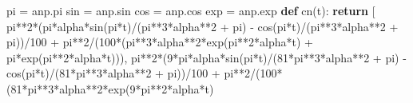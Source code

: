 \documentclass[
  11pt,
]{article}
\newenvironment{Shaded}{}{}
\newcommand{\ControlFlowTok}[1]{\textcolor[rgb]{0.00,0.44,0.13}{\textbf{#1}}}
\newcommand{\DecValTok}[1]{\textcolor[rgb]{0.25,0.63,0.44}{#1}}
\newcommand{\KeywordTok}[1]{\textcolor[rgb]{0.00,0.44,0.13}{\textbf{#1}}}
\newcommand{\NormalTok}[1]{#1}
\newcommand{\OperatorTok}[1]{\textcolor[rgb]{0.40,0.40,0.40}{#1}}
\begin{document}
\begin{Shaded}
\begin{Highlighting}[]
\NormalTok{pi }\OperatorTok{=}\NormalTok{ anp.pi}
\NormalTok{sin }\OperatorTok{=}\NormalTok{ anp.sin}
\NormalTok{cos }\OperatorTok{=}\NormalTok{ anp.cos}
\NormalTok{exp }\OperatorTok{=}\NormalTok{ anp.exp}
\KeywordTok{def}\NormalTok{ cn(t):}
    \ControlFlowTok{return}\NormalTok{ [}
\NormalTok{        pi}\OperatorTok{**}\DecValTok{2}\OperatorTok{*}\NormalTok{(pi}\OperatorTok{*}\NormalTok{alpha}\OperatorTok{*}\NormalTok{sin(pi}\OperatorTok{*}\NormalTok{t)}\OperatorTok{/}\NormalTok{(pi}\OperatorTok{**}\DecValTok{3}\OperatorTok{*}\NormalTok{alpha}\OperatorTok{**}\DecValTok{2} \OperatorTok{+}\NormalTok{ pi) }
            \OperatorTok{{-}}\NormalTok{ cos(pi}\OperatorTok{*}\NormalTok{t)}\OperatorTok{/}\NormalTok{(pi}\OperatorTok{**}\DecValTok{3}\OperatorTok{*}\NormalTok{alpha}\OperatorTok{**}\DecValTok{2} \OperatorTok{+}\NormalTok{ pi))}\OperatorTok{/}\DecValTok{100} 
            \OperatorTok{+}\NormalTok{ pi}\OperatorTok{**}\DecValTok{2}\OperatorTok{/}\NormalTok{(}\DecValTok{100}\OperatorTok{*}\NormalTok{(pi}\OperatorTok{**}\DecValTok{3}\OperatorTok{*}\NormalTok{alpha}\OperatorTok{**}\DecValTok{2}\OperatorTok{*}\NormalTok{exp(pi}\OperatorTok{**}\DecValTok{2}\OperatorTok{*}\NormalTok{alpha}\OperatorTok{*}\NormalTok{t) }
            \OperatorTok{+}\NormalTok{ pi}\OperatorTok{*}\NormalTok{exp(pi}\OperatorTok{**}\DecValTok{2}\OperatorTok{*}\NormalTok{alpha}\OperatorTok{*}\NormalTok{t))), }
\NormalTok{        pi}\OperatorTok{**}\DecValTok{2}\OperatorTok{*}\NormalTok{(}\DecValTok{9}\OperatorTok{*}\NormalTok{pi}\OperatorTok{*}\NormalTok{alpha}\OperatorTok{*}\NormalTok{sin(pi}\OperatorTok{*}\NormalTok{t)}\OperatorTok{/}\NormalTok{(}\DecValTok{81}\OperatorTok{*}\NormalTok{pi}\OperatorTok{**}\DecValTok{3}\OperatorTok{*}\NormalTok{alpha}\OperatorTok{**}\DecValTok{2} \OperatorTok{+}\NormalTok{ pi) }
            \OperatorTok{{-}}\NormalTok{ cos(pi}\OperatorTok{*}\NormalTok{t)}\OperatorTok{/}\NormalTok{(}\DecValTok{81}\OperatorTok{*}\NormalTok{pi}\OperatorTok{**}\DecValTok{3}\OperatorTok{*}\NormalTok{alpha}\OperatorTok{**}\DecValTok{2} \OperatorTok{+}\NormalTok{ pi))}\OperatorTok{/}\DecValTok{100}
            \OperatorTok{+}\NormalTok{ pi}\OperatorTok{**}\DecValTok{2}\OperatorTok{/}\NormalTok{(}\DecValTok{100}\OperatorTok{*}\NormalTok{(}\DecValTok{81}\OperatorTok{*}\NormalTok{pi}\OperatorTok{**}\DecValTok{3}\OperatorTok{*}\NormalTok{alpha}\OperatorTok{**}\DecValTok{2}\OperatorTok{*}\NormalTok{exp(}\DecValTok{9}\OperatorTok{*}\NormalTok{pi}\OperatorTok{**}\DecValTok{2}\OperatorTok{*}\NormalTok{alpha}\OperatorTok{*}\NormalTok{t) }

\end{Highlighting}
\end{Shaded}
\end{document}
